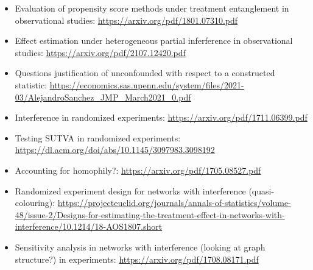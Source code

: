 \documentclass[10pt]{article}
\begin{document}
\begin{itemize}

\item
Evaluation of propensity score methods under treatment entanglement in observational studies: \url{https://arxiv.org/pdf/1801.07310.pdf}

\item
Effect estimation under heterogeneous partial inferference in observational studies: \url{https://arxiv.org/pdf/2107.12420.pdf}

\item
Questions justification of unconfounded with respect to a constructed statistic: \url{https://economics.sas.upenn.edu/system/files/2021-03/AlejandroSanchez_JMP_March2021_0.pdf}

\item
Interference in randomized experiments: \url{https://arxiv.org/pdf/1711.06399.pdf}

\item
Testing SUTVA in randomized experiments: \url{https://dl.acm.org/doi/abs/10.1145/3097983.3098192}

\item
Accounting for homophily?: \url{https://arxiv.org/pdf/1705.08527.pdf}

\item
Randomized experiment design for networks with interference (quasi-colouring): \url{https://projecteuclid.org/journals/annals-of-statistics/volume-48/issue-2/Designs-for-estimating-the-treatment-effect-in-networks-with-interference/10.1214/18-AOS1807.short}

\item
Sensitivity analysis in networks with interference (looking at graph structure?) in experiments: \url{https://arxiv.org/pdf/1708.08171.pdf}


\end{itemize}


\newpage

\printbibliography
\end{document}
